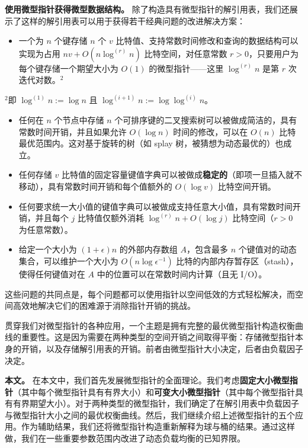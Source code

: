 \documentclass[12pt,a4paper]{ctexart}
\theoremstyle{remark}
\begin{document}
\textbf{使用微型指针获得微型数据结构。} 除了构造具有微型指针的解引用表，我们还展示了这样的解引用表可以用于获得若干经典问题的改进解决方案：

\begin{itemize}
\item 一个为 $n$ 个键存储 $n$ 个 $v$ 比特值、支持常数时间修改和查询的数据结构可以实现为占用 $nv+O(n\log^{(r)}n)$ 比特空间，对任意常数 $r>0$，只要用户为每个键存储一个期望大小为 $O(1)$ 的微型指针——这里 $\log^{(r)}n$ 是第 $r$ 次迭代对数。$^2$
\end{itemize}

$^2$即 $\log^{(1)}n:=\log n$ 且 $\log^{(i+1)}n:=\log\log^{(i)}n$。

\begin{itemize}
\item 任何在 $n$ 个节点中存储 $n$ 个可排序键的二叉搜索树可以被做成简洁的，具有常数时间开销，并且如果允许 $O(\log n)$ 时间的修改，可以在 $O(n)$ 比特最优范围内。这对基于旋转的树（如 splay 树，被猜想为动态最优的）也成立。
\item 任何存储 $v$ 比特值的固定容量键值字典可以被做成\textbf{稳定的}（即项一旦插入就不移动），具有常数时间开销和每个值额外的 $O(\log v)$ 比特空间开销。
\item 任何要求统一大小值的键值字典可以被做成支持任意大小值，具有常数时间开销，并且每个 $j$ 比特值仅额外消耗 $\log^{(r)}n+O(\log j)$ 比特空间（$r>0$ 为任意常数）。
\item 给定一个大小为 $(1+\epsilon)n$ 的外部内存数组 $A$，包含最多 $n$ 个键值对的动态集合，可以维护一个大小为 $O(n\log\epsilon^{-1})$ 比特的内部内存暂存区（stash），使得任何键值对在 $A$ 中的位置可以在常数时间内计算（且无 I/O）。
\end{itemize}

这些问题的共同点是，每个问题都可以使用指针以空间低效的方式轻松解决，而空间高效地解决它们的困难源于消除指针开销的挑战。

贯穿我们对微型指针的各种应用，一个主题是拥有完整的最优微型指针构造权衡曲线的重要性。这是因为需要在两种类型的空间开销之间取得平衡：存储微型指针本身的开销，以及存储解引用表的开销。前者由微型指针大小决定，后者由负载因子决定。

\textbf{本文。} 在本文中，我们首先发展微型指针的全面理论。我们考虑\textbf{固定大小微型指针}（其中每个微型指针具有有界大小）和\textbf{可变大小微型指针}（其中每个微型指针具有有界期望大小）。对于两种类型的微型指针，我们确定了在解引用表中负载因子与微型指针大小之间的最优权衡曲线。然后，我们继续介绍上述微型指针的五个应用。作为辅助结果，我们还将微型指针构造重新解释为球与桶的结果。通过这样做，我们在一些重要参数范围内改进了动态负载均衡的已知界限。
\end{document}
